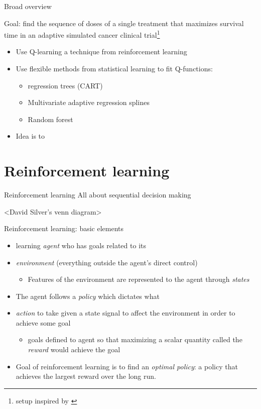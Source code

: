 \documentclass[handout]{beamer}
\begin{document}
\begin{frame}[c]{Broad overview}

Goal: find the sequence of doses of a single treatment that maximizes survival time in an adaptive simulated cancer clinical trial\footnote{setup inspired by \textcite{crt}} 
\begin{itemize}
    \item Use Q-learning a technique from reinforcement learning
    \item Use flexible methods from statistical learning to fit Q-functions: 
    \begin{itemize}
      \item regression trees (CART)
      \item Multivariate adaptive regression splines
      \item Random forest
    \end{itemize}
    \item Idea is to  
\end{itemize}

\end{frame}

\section{Reinforcement learning} %
\label{sec:reinforcement_learning}

\begin{frame}[t]{Reinforcement learning}
  All about sequential decision making
  
  <David Silver's venn diagram>
  
\end{frame}

\begin{frame}[c]{Reinforcement learning: basic elements}

\begin{itemize}[<+->]
  \item learning \emph{agent} who has goals related to its
  \item \emph{environment} (everything outside the agent's direct control)
  \begin{itemize}
    \item Features of the environment are represented to the agent through \emph{states}
  \end{itemize}
  \item The agent follows a \emph{policy} which dictates what 
  \item \emph{action} to take given a state signal to affect the environment in order to achieve some goal
  \begin{itemize}
    \item goals defined to agent so that maximizing a scalar quantity called the \emph{reward} would achieve the goal
  \end{itemize}
  \item Goal of reinforcement learning is to find an \emph{optimal policy}: a policy that achieves the largest reward over the long run. 
\end{itemize}

\end{frame}
\end{document}
